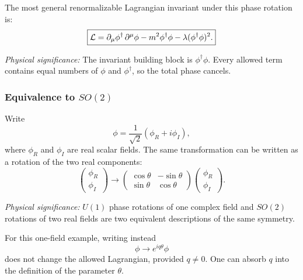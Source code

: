 \documentclass[../main.tex]{subfiles}
\begin{document}
The most general renormalizable Lagrangian invariant under this phase rotation is:
\begin{equation}
  \boxed{
  \mathcal{L}
  =
  \partial_\mu\phi^\dagger\,\partial^\mu\phi
  -m^2\phi^\dagger\phi
  -\lambda(\phi^\dagger\phi)^2.}
  \label{eq:lec09:complex-scalar-u1-lagrangian}
\end{equation}

\textit{Physical significance:} The invariant building block is $\phi^\dagger\phi$.  Every allowed term contains equal numbers of $\phi$ and $\phi^\dagger$, so the total phase cancels.

\subsubsection*{Equivalence to $SO(2)$}

Write
\begin{equation}
  \boxed{
  \phi=\frac{1}{\sqrt{2}}(\phi_R+i\phi_I),}
  \label{eq:lec09:complex-to-real}
\end{equation}
where $\phi_R$ and $\phi_I$ are real scalar fields.  The same transformation can be written as a rotation of the two real components:
\begin{equation}
  \boxed{
  \begin{pmatrix}\phi_R\\ \phi_I\end{pmatrix}
  \longrightarrow
  \begin{pmatrix}
    \cos\theta & -\sin\theta\\
    \sin\theta & \cos\theta
  \end{pmatrix}
  \begin{pmatrix}\phi_R\\ \phi_I\end{pmatrix}.}
  \label{eq:lec09:so2-rotation}
\end{equation}

\textit{Physical significance:} $U(1)$ phase rotations of one complex field and $SO(2)$ rotations of two real fields are two equivalent descriptions of the same symmetry.

For this one-field example, writing instead
\begin{equation}
  \boxed{
  \phi\longrightarrow e^{iq\theta}\phi}
  \label{eq:lec09:u1-charge-single-field}
\end{equation}
does not change the allowed Lagrangian, provided $q\neq0$.  One can absorb $q$ into the definition of the parameter $\theta$.
\end{document}
